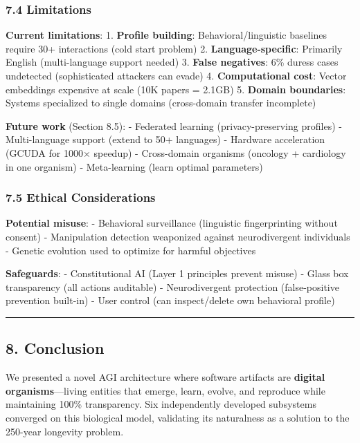 \documentclass[
]{article}
\begin{document}
\subsubsection{7.4 Limitations}\label{limitations}

\textbf{Current limitations}: 1. \textbf{Profile building}:
Behavioral/linguistic baselines require 30+ interactions (cold start
problem) 2. \textbf{Language-specific}: Primarily English
(multi-language support needed) 3. \textbf{False negatives}: 6\% duress
cases undetected (sophisticated attackers can evade) 4.
\textbf{Computational cost}: Vector embeddings expensive at scale (10K
papers = 2.1GB) 5. \textbf{Domain boundaries}: Systems specialized to
single domains (cross-domain transfer incomplete)

\textbf{Future work} (Section 8.5): - Federated learning
(privacy-preserving profiles) - Multi-language support (extend to 50+
languages) - Hardware acceleration (GCUDA for 1000× speedup) -
Cross-domain organisms (oncology + cardiology in one organism) -
Meta-learning (learn optimal parameters)

\subsubsection{7.5 Ethical Considerations}\label{ethical-considerations}

\textbf{Potential misuse}: - Behavioral surveillance (linguistic
fingerprinting without consent) - Manipulation detection weaponized
against neurodivergent individuals - Genetic evolution used to optimize
for harmful objectives

\textbf{Safeguards}: - Constitutional AI (Layer 1 principles prevent
misuse) - Glass box transparency (all actions auditable) -
Neurodivergent protection (false-positive prevention built-in) - User
control (can inspect/delete own behavioral profile)

\begin{center}\rule{0.5\linewidth}{0.5pt}\end{center}

\subsection{8. Conclusion}\label{conclusion}

We presented a novel AGI architecture where software artifacts are
\textbf{digital organisms}---living entities that emerge, learn, evolve,
and reproduce while maintaining 100\% transparency. Six independently
developed subsystems converged on this biological model, validating its
naturalness as a solution to the 250-year longevity problem.
\end{document}
